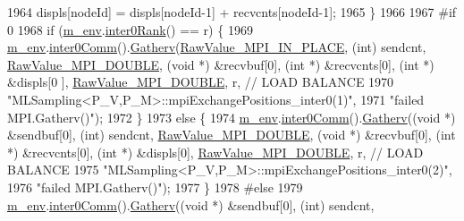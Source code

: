 \begin{DoxyCode}
1964       displs[nodeId] = displs[nodeId-1] + recvcnts[nodeId-1];
1965     \}
1966 
1967 \textcolor{preprocessor}{#if 0}
1968 \textcolor{preprocessor}{}    \textcolor{keywordflow}{if} (\hyperlink{class_q_u_e_s_o_1_1_m_l_sampling_a13f1ca4fe9f94822fe572a743eaced1d}{m\_env}.\hyperlink{class_q_u_e_s_o_1_1_base_environment_ae106b5bb8a80b655b88b3a26b1e7c185}{inter0Rank}() == r) \{
1969       \hyperlink{class_q_u_e_s_o_1_1_m_l_sampling_a13f1ca4fe9f94822fe572a743eaced1d}{m\_env}.\hyperlink{class_q_u_e_s_o_1_1_base_environment_a689e4d140c74d495d97eb498714a4b82}{inter0Comm}().\hyperlink{class_q_u_e_s_o_1_1_mpi_comm_a9313449240c1bb2289870309a5c711ed}{Gatherv}(\hyperlink{_mpi_comm_8h_a578a93c04b9dab934e3a90f0beed4edf}{RawValue\_MPI\_IN\_PLACE}, (\textcolor{keywordtype}{int}) 
      sendcnt, \hyperlink{_mpi_comm_8h_ad0f503bd9fecfe4e570ca3d15aaf2518}{RawValue\_MPI\_DOUBLE}, (\textcolor{keywordtype}{void} *) &recvbuf[0], (\textcolor{keywordtype}{int} *) &recvcnts[0], (\textcolor{keywordtype}{int} *) &displs[0
      ], \hyperlink{_mpi_comm_8h_ad0f503bd9fecfe4e570ca3d15aaf2518}{RawValue\_MPI\_DOUBLE}, r, \textcolor{comment}{// LOAD BALANCE}
1970                                  \textcolor{stringliteral}{"MLSampling<P\_V,P\_M>::mpiExchangePositions\_inter0(1)"},
1971                                  \textcolor{stringliteral}{"failed MPI.Gatherv()"});
1972     \}
1973     \textcolor{keywordflow}{else} \{
1974       \hyperlink{class_q_u_e_s_o_1_1_m_l_sampling_a13f1ca4fe9f94822fe572a743eaced1d}{m\_env}.\hyperlink{class_q_u_e_s_o_1_1_base_environment_a689e4d140c74d495d97eb498714a4b82}{inter0Comm}().\hyperlink{class_q_u_e_s_o_1_1_mpi_comm_a9313449240c1bb2289870309a5c711ed}{Gatherv}((\textcolor{keywordtype}{void} *) &sendbuf[0], (\textcolor{keywordtype}{int}) sendcnt, 
      \hyperlink{_mpi_comm_8h_ad0f503bd9fecfe4e570ca3d15aaf2518}{RawValue\_MPI\_DOUBLE}, (\textcolor{keywordtype}{void} *) &recvbuf[0], (\textcolor{keywordtype}{int} *) &recvcnts[0], (\textcolor{keywordtype}{int} *) &displs[0], 
      \hyperlink{_mpi_comm_8h_ad0f503bd9fecfe4e570ca3d15aaf2518}{RawValue\_MPI\_DOUBLE}, r, \textcolor{comment}{// LOAD BALANCE}
1975                                  \textcolor{stringliteral}{"MLSampling<P\_V,P\_M>::mpiExchangePositions\_inter0(2)"},
1976                                  \textcolor{stringliteral}{"failed MPI.Gatherv()"});
1977     \}
1978 \textcolor{preprocessor}{#else}
1979 \textcolor{preprocessor}{}    \hyperlink{class_q_u_e_s_o_1_1_m_l_sampling_a13f1ca4fe9f94822fe572a743eaced1d}{m\_env}.\hyperlink{class_q_u_e_s_o_1_1_base_environment_a689e4d140c74d495d97eb498714a4b82}{inter0Comm}().\hyperlink{class_q_u_e_s_o_1_1_mpi_comm_a9313449240c1bb2289870309a5c711ed}{Gatherv}((\textcolor{keywordtype}{void} *) &sendbuf[0], (\textcolor{keywordtype}{int}) sendcnt, 

\end{DoxyCode}

